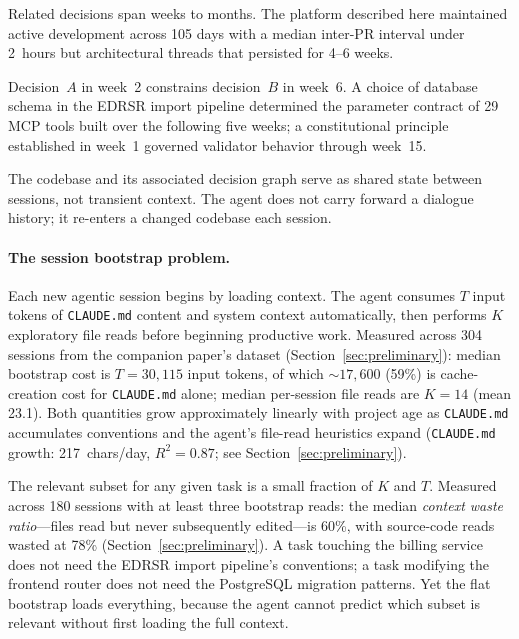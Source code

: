 \documentclass[11pt]{article}
\begin{document}
\begin{description}[leftmargin=1.5em, nosep]
  \item[Horizon.] Related decisions span weeks to months. The platform described here maintained active development across 105 days with a median inter-PR interval under 2~hours but architectural threads that persisted for 4--6 weeks.
  \item[Compositionality.] Decision~$A$ in week~2 constrains decision~$B$ in week~6. A choice of database schema in the EDRSR import pipeline determined the parameter contract of 29 MCP tools built over the following five weeks; a constitutional principle established in week~1 governed validator behavior through week~15.
  \item[Persistence.] The codebase and its associated decision graph serve as shared state between sessions, not transient context. The agent does not carry forward a dialogue history; it re-enters a changed codebase each session.
\end{description}

\paragraph{The session bootstrap problem.}
Each new agentic session begins by loading context.
The agent consumes $T$ input tokens of \texttt{CLAUDE.md} content and system context automatically, then performs $K$ exploratory file reads before beginning productive work.
Measured across 304 sessions from the companion paper's dataset (Section~\ref{sec:preliminary}): median bootstrap cost is $T = 30{,}115$ input tokens, of which ${\sim}17{,}600$ (59\%) is cache-creation cost for \texttt{CLAUDE.md} alone; median per-session file reads are $K = 14$ (mean 23.1).
Both quantities grow approximately linearly with project age as \texttt{CLAUDE.md} accumulates conventions and the agent's file-read heuristics expand (\texttt{CLAUDE.md} growth: 217~chars/day, $R^2 = 0.87$; see Section~\ref{sec:preliminary}).

The relevant subset for any given task is a small fraction of $K$ and $T$.
Measured across 180 sessions with at least three bootstrap reads: the median \emph{context waste ratio}---files read but never subsequently edited---is 60\%, with source-code reads wasted at 78\% (Section~\ref{sec:preliminary}).
A task touching the billing service does not need the EDRSR import pipeline's conventions; a task modifying the frontend router does not need the PostgreSQL migration patterns.
Yet the flat bootstrap loads everything, because the agent cannot predict which subset is relevant without first loading the full context.
\end{document}
